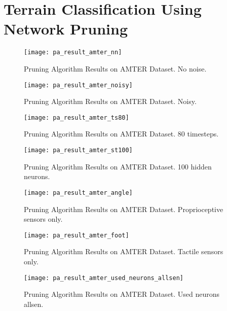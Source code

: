 \section[Terrain Classification Using Network Pruning]{Terrain Classification Using Network Pruning} \label{sec:pa_amter}

\begin{figure}[H]
  \centering
  \texttt{[image: pa\_result\_amter\_nn]}
  \caption{Pruning Algorithm Results on AMTER Dataset. No noise.}
  \label{fig:pa_result_amter}
\end{figure}

\begin{figure}[H]
  \centering
  \texttt{[image: pa\_result\_amter\_noisy]}
  \caption{Pruning Algorithm Results on AMTER Dataset. Noisy.}
  \label{fig:pa_result_amter_noisy}
\end{figure}

\begin{figure}[H]
  \centering
  \texttt{[image: pa\_result\_amter\_ts80]}
  \caption{Pruning Algorithm Results on AMTER Dataset. 80 timesteps.}
  \label{fig:pa_result_amter_80}
\end{figure}

\begin{figure}[H]
  \centering
  \texttt{[image: pa\_result\_amter\_st100]}
  \caption{Pruning Algorithm Results on AMTER Dataset. 100 hidden neurons.}
  \label{fig:pa_result_amter_st100}
\end{figure}

\begin{figure}[H]
  \centering
  \texttt{[image: pa\_result\_amter\_angle]}
  \caption{Pruning Algorithm Results on AMTER Dataset. Proprioceptive sensors only.}
  \label{fig:pa_result_amter_angle}
\end{figure}

\begin{figure}[H]
  \centering
  \texttt{[image: pa\_result\_amter\_foot]}
  \caption{Pruning Algorithm Results on AMTER Dataset. Tactile sensors only.}
  \label{fig:pa_result_amter_foot}
\end{figure}

\begin{figure}[H]
  \centering
  \texttt{[image: pa\_result\_amter\_used\_neurons\_allsen]}
  \caption{Pruning Algorithm Results on AMTER Dataset. Used neurons allsen.}
  \label{fig:pa_amter_used_neurons_allsen}
\end{figure}

